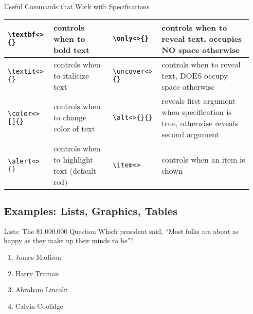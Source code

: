 \documentclass[pdf]{beamer}
\begin{document}
\begin{frame}[fragile]{Useful Commands that Work with Specifications}
\begin{footnotesize}
\begin{table}
\begin{tabular}{|p{.75in}|p{1in}|p{.75in}|p{1in}|} \hline
  \verb=\textbf<>{}= & controls when to bold text
 & \verb=\only<>{}= & controls when to reveal text, occupies NO space otherwise \\ \hline
  \verb=\textit<>{}= & controls when to italicize text
 & \verb=\uncover<>{}= & controls when to reveal text, DOES occupy space
 otherwise \\ \hline
  \verb=\color<>[]{}= & controls when to change color of text
 & \verb=\alt<>{}{}= & reveals first argument when specification is
 true, otherwise reveals second argument \\ \hline
  \verb=\alert<>{}= & controls when to highlight text (default red)
 & \verb=\item<>= & controls when an item is shown \\ \hline
\end{tabular}
\end{table}
\end{footnotesize}
\end{frame}

\subsection[Examples]{Examples: Lists, Graphics, Tables}

\begin{frame}{Lists: The \$1,000,000 Question}
Which president said, ``Most folks are about as happy as they make up their minds to be''?
\begin{enumerate}[A]
\item<2-5> James Madison
\item<3-5> Harry Truman
\item<4-> Abraham Lincoln
\item<5-5> Calvin Coolidge
\end{enumerate}
\\
\\
\\
\\
\\
\end{frame}
\end{document}
